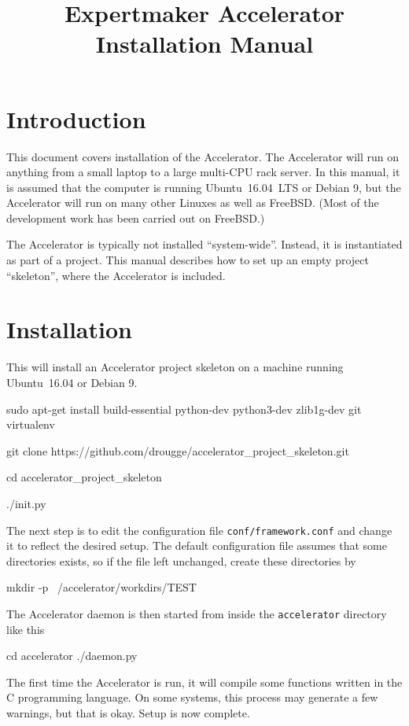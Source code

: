 \documentclass[a4paper]{article}
\title{\vspace{-0.5cm}Expertmaker Accelerator Installation Manual\vspace{-0.5cm}}
\date{}
\begin{document}
\maketitle

\section{Introduction}

This document covers installation of the Accelerator.  The Accelerator
will run on anything from a small laptop to a large multi-CPU rack
server.  In this manual, it is assumed that the computer is running
Ubuntu~16.04~LTS or Debian 9, but the Accelerator will run on many
other Linuxes as well as FreeBSD.  (Most of the development work has
been carried out on FreeBSD.)

The Accelerator is typically not installed ``system-wide''.  Instead,
it is instantiated as part of a project.  This manual describes how to
set up an empty project ``skeleton'', where the Accelerator is
included.



\section{Installation}
This will install an Accelerator project skeleton on a machine running
Ubuntu~16.04 or Debian 9.
\begin{shell}
sudo apt-get install build-essential python-dev python3-dev zlib1g-dev git virtualenv

git clone https://github.com/drougge/accelerator_project_skeleton.git

cd accelerator_project_skeleton

./init.py
\end{shell}
The next step is to edit the configuration file
\texttt{conf/framework.conf} and change it to reflect the desired
setup.  The default configuration file assumes that some directories
exists, so if the file left unchanged, create these directories by
\begin{shell}
mkdir -p ~/accelerator/workdirs/TEST
\end{shell}
The Accelerator daemon is then started from inside the
\texttt{accelerator} directory like this
\begin{shell}
cd accelerator
./daemon.py  
\end{shell}
The first time the Accelerator is run, it will compile some functions
written in the C programming language.  On some systems, this process
may generate a few warnings, but that is okay.  Setup is now complete.
\thispagestyle{empty}
\end{document}
